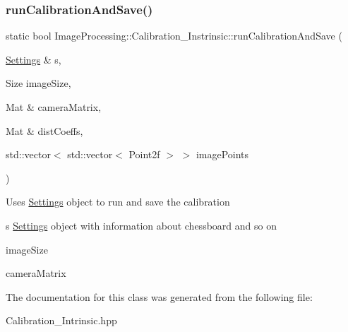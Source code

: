 \subsubsection{\texorpdfstring{run\+Calibration\+And\+Save()}{runCalibrationAndSave()}}
{\footnotesize\ttfamily static bool Image\+Processing\+::\+Calibration\+\_\+\+Instrinsic\+::run\+Calibration\+And\+Save (\begin{DoxyParamCaption}\item[{\mbox{\hyperlink{class_image_processing_1_1_settings}{Settings}} \&}]{s,  }\item[{Size}]{image\+Size,  }\item[{Mat \&}]{camera\+Matrix,  }\item[{Mat \&}]{dist\+Coeffs,  }\item[{std\+::vector$<$ std\+::vector$<$ Point2f $>$ $>$}]{image\+Points }\end{DoxyParamCaption})\hspace{0.3cm}{\ttfamily [static]}}

Uses \mbox{\hyperlink{class_image_processing_1_1_settings}{Settings}} object to run and save the calibration \begin{DoxyItemize}
\item s \mbox{\hyperlink{class_image_processing_1_1_settings}{Settings}} object with information about chessboard and so on \item image\+Size \item camera\+Matrix \end{DoxyItemize}


The documentation for this class was generated from the following file\+:\begin{DoxyCompactItemize}
\item 
Calibration\+\_\+\+Intrinsic.\+hpp\end{DoxyCompactItemize}
